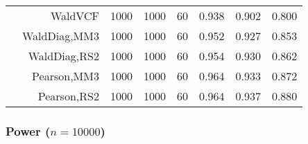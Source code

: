 \documentclass[
]{article}
\begin{document}
\begin{table}[H]
{\begin{tabular}[t]{lrrrrrrr}
\hspace{1em} & WaldVCF & 1000 & 1000 & 60 & 0.938 & 0.902 & 0.800\\

\hspace{1em} & WaldDiag,MM3 & 1000 & 1000 & 60 & 0.952 & 0.927 & 0.853\\

\hspace{1em} & WaldDiag,RS2 & 1000 & 1000 & 60 & 0.954 & 0.930 & 0.862\\

\hspace{1em} & Pearson,MM3 & 1000 & 1000 & 60 & 0.964 & 0.933 & 0.872\\

\hspace{1em} & Pearson,RS2 & 1000 & 1000 & 60 & 0.964 & 0.937 & 0.880\\
\bottomrule
\end{tabular}}
\endgroup{}
\end{table}

\hypertarget{power-n10000}{%
\subsubsection{\texorpdfstring{Power
(\(n=10000\))}{Power (n=10000)}}\label{power-n10000}}
\end{document}
